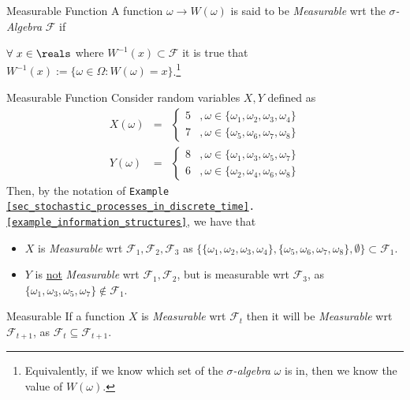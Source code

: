 \documentclass[11pt,a4paper]{article}
\begin{document}
  \begin{definition}{Measurable Function}
    A function $\omega\to W(\omega)$ is said to be \textit{Measurable} wrt the \textit{$\sigma$-Algebra} $\mathcal{F}$ if
    \begin{center}
      $\forall\ x\in\reals$ where $W^{-1}(x)\subset\mathcal{F}$ it is true that $W^{-1}(x):=\big\{\omega\in\Omega:W(\omega)=x\big\}$.\footnote{Equivalently, if we know which set of the \textit{$\sigma$-algebra} $\omega$ is in, then we know the value of $W(\omega)$.}
    \end{center}
  \end{definition}

  \begin{example}{Measurable Function}
    Consider random variables $X,Y$ defined as
    \[\begin{array}{rcl}
      X(\omega)&=&\begin{cases}
        5&,\omega\in\{\omega_1,\omega_2,\omega_3,\omega_4\}\\
        7&,\omega\in\{\omega_5,\omega_6,\omega_7,\omega_8\}
      \end{cases}\\
      Y(\omega)&=&\begin{cases}
        8&,\omega\in\{\omega_1,\omega_3,\omega_5,\omega_7\}\\
        6&,\omega\in\{\omega_2,\omega_4,\omega_6,\omega_8\}
      \end{cases}
    \end{array}\]
    Then, by the notation of \texttt{Example \ref{sec_stochastic_processes_in_discrete_time}.\ref{example_information_structures}}, we have that
    \begin{itemize}
      \item $X$ is \textit{Measurable} wrt $\mathcal{F}_1,\mathcal{F}_2,\mathcal{F}_3$ as $\big\{\{\omega_1,\omega_2,\omega_3,\omega_4\},\{\omega_5,\omega_6,\omega_7,\omega_8\},\emptyset\big\}\subset\mathcal{F}_1$.
      \item $Y$ is \underline{not} \textit{Measurable} wrt $\mathcal{F}_1,\mathcal{F}_2$, but is measurable wrt $\mathcal{F}_3$, as $\{\omega_1,\omega_3,\omega_5,\omega_7\}\not\in\mathcal{F}_1$.
    \end{itemize}
  \end{example}

  \begin{remark}{Measurable}
    If a function $X$ is \textit{Measurable} wrt $\mathcal{F}_t$ then it will be \textit{Measurable} wrt $\mathcal{F}_{t+1}$, as $\mathcal{F}_t\subseteq\mathcal{F}_{t+1}$.
  \end{remark}
\end{document}
